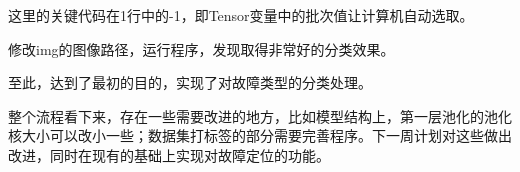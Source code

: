 \documentclass{article}
\begin{document}
	这里的关键代码在1行中的-1，即Tensor变量中的批次值让计算机自动选取。
	
	修改img的图像路径，运行程序，发现取得非常好的分类效果。
	
	\begin{figure}[ht]
		\centering
	
		
	
		
	\end{figure}

	至此，达到了最初的目的，实现了对故障类型的分类处理。
	
	整个流程看下来，存在一些需要改进的地方，比如模型结构上，第一层池化的池化核大小可以改小一些；数据集打标签的部分需要完善程序。下一周计划对这些做出改进，同时在现有的基础上实现对故障定位的功能。
	
\end{document}
